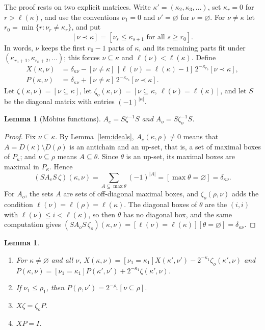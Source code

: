 \documentclass[11pt]{amsart}
\newtheorem{lemma}[theorem]{Lemma}
\theoremstyle{definition}
\theoremstyle{remark}
\begin{document}
The proof rests on two explicit matrices. Write $\kappa'=(\kappa_2,\kappa_3,\dots)$, set
$\kappa_r=0$ for $r>\ell(\kappa)$, and use the conventions $\nu_1=0$ and $\nu'=\varnothing$ for
$\nu=\varnothing$. For $\nu\ne\kappa$ let $r_0=\min\{r:\nu_r\ne\kappa_r\}$, and put
\[ [\nu\prec\kappa]=[\nu_s\le\kappa_{s+1}\text{ for all }s\ge r_0]. \]
In words, $\nu$ keeps the first $r_0-1$ parts of $\kappa$, and its remaining parts fit under
$(\kappa_{r_0+1},\kappa_{r_0+2},\dots)$; this forces $\nu\subseteq\kappa$ and
$\ell(\nu)<\ell(\kappa)$. Define
\begin{align*}
X(\kappa,\nu)&=\delta_{\kappa\nu}-[\nu\ne\kappa]\,[\ell(\nu)=\ell(\kappa)-1]\,2^{-\kappa_{r_0}}[\nu\prec\kappa],\\
P(\kappa,\nu)&=\delta_{\kappa\nu}+[\nu\ne\kappa]\,2^{-\kappa_{r_0}}[\nu\prec\kappa].
\end{align*}
Let $\zeta(\kappa,\nu)=[\nu\subseteq\kappa]$, let $\zeta_o(\kappa,\nu)=[\nu\subseteq\kappa,\
\ell(\nu)=\ell(\kappa)]$, and let $S$ be the diagonal matrix with entries $(-1)^{|\kappa|}$.

\begin{lemma}[M\"obius functions]\label{lem:mobius}
$A_e=S\zeta^{-1}S$ and $A_o=S\zeta_o^{-1}S$.
\end{lemma}

\begin{proof}
Fix $\nu\subseteq\kappa$. By Lemma~\ref{lem:ideals}, $A_e(\kappa,\rho)\ne0$ means that
$A=D(\kappa)\setminus D(\rho)$ is an antichain and an up-set, that is, a set of maximal boxes of
$P_\kappa$; and $\nu\subseteq\rho$ means $A\subseteq\theta$. Since $\theta$ is an up-set, its
maximal boxes are maximal in $P_\kappa$. Hence
\[ (SA_eS\,\zeta)(\kappa,\nu)=\sum_{A\subseteq\max\theta}(-1)^{|A|}=[\max\theta=\varnothing]=\delta_{\kappa\nu}. \]
For $A_o$, the sets $A$ are sets of off-diagonal maximal boxes, and $\zeta_o(\rho,\nu)$ adds the
condition $\ell(\nu)=\ell(\rho)=\ell(\kappa)$. The diagonal boxes of $\theta$ are the $(i,i)$ with
$\ell(\nu)\le i<\ell(\kappa)$, so then $\theta$ has no diagonal box, and the same computation gives
$(SA_oS\,\zeta_o)(\kappa,\nu)=[\ell(\nu)=\ell(\kappa)][\theta=\varnothing]=\delta_{\kappa\nu}$.
\end{proof}

\begin{lemma}\label{lem:XP}
\begin{enumerate}[label=(\alph*)]
\item For $\kappa\ne\varnothing$ and all $\nu$,
$X(\kappa,\nu)=[\nu_1=\kappa_1]X(\kappa',\nu')-2^{-\kappa_1}\zeta_o(\kappa',\nu)$ and
$P(\kappa,\nu)=[\nu_1=\kappa_1]P(\kappa',\nu')+2^{-\kappa_1}\zeta(\kappa',\nu)$.
\item If $\nu_1\le\rho_1$, then $P(\rho,\nu')=2^{-\rho_1}[\nu\subseteq\rho]$.
\item $X\zeta=\zeta_oP$.
\item $XP=I$.
\end{enumerate}
\end{lemma}
\end{document}
